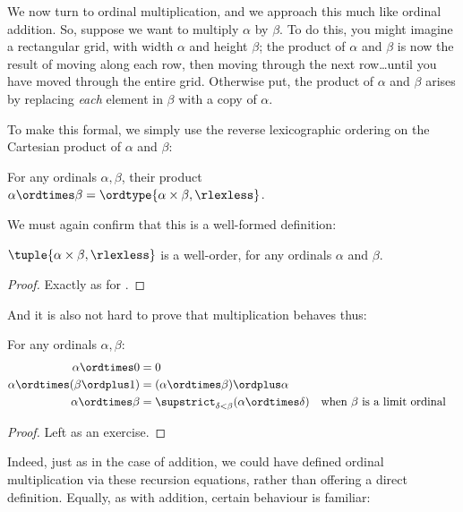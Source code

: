 \documentclass[../../../include/open-logic-section]{subfiles}
\begin{document}
We now turn to ordinal multiplication, and we approach this much like ordinal addition. So, suppose we want to multiply $\alpha$ by $\beta$. To do this, you might imagine a rectangular grid, with width $\alpha$ and height $\beta$; the product of $\alpha$ and $\beta$ is now the result of moving along each row, then moving through the next row\ldots until you have moved through the entire grid. Otherwise put, the product of $\alpha$ and $\beta$ arises by replacing \emph{each} element in $\beta$ with a copy of $\alpha$.  

To make this formal, we simply use the reverse lexicographic ordering on the Cartesian product of $\alpha$ and $\beta$:
\begin{defn}
	For any ordinals $\alpha, \beta$, their product $\alpha \ordtimes \beta = \ordtype{\alpha \times \beta, \rlexless}$.
\end{defn}\noindent
We must again confirm that this is a well-formed definition:
\begin{lem}$\tuple{\alpha \times \beta, \rlexless}$ is a well-order, for any ordinals $\alpha$ and $\beta$.
\end{lem}
\begin{proof}
	Exactly as for .
\end{proof}\noindent 
And it is also not hard to prove that multiplication behaves thus:
\begin{lem} For any ordinals $\alpha, \beta$:
	\begin{align*}
		\alpha \ordtimes 0 &= 0\\
		\alpha \ordtimes (\beta \ordplus 1) &= (\alpha \ordtimes \beta) \ordplus \alpha\\
		\alpha  \ordtimes \beta &= \supstrict_{\delta < \beta}(\alpha \ordtimes \delta) && \text{when $\beta$ is a limit ordinal}
	\end{align*}
\end{lem}
\begin{proof}
	Left as an exercise.
\end{proof}\noindent
Indeed, just as in the case of addition, we could have defined ordinal multiplication via these recursion equations, rather than offering a direct definition. Equally, as with addition, certain behaviour is familiar:
\end{document}
